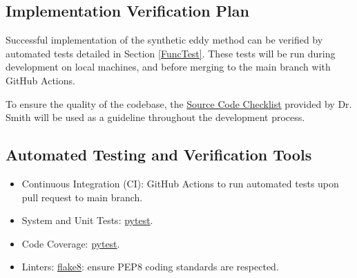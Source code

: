 \documentclass[12pt, titlepage]{article}
\begin{document}

\subsection{Implementation Verification Plan}

Successful implementation of the synthetic eddy method can be verified by automated tests detailed in Section \ref{FuncTest}. These tests will be run during development on local machines, and before merging to the main branch with GitHub Actions.

To ensure the quality of the codebase, the \href{https://github.com/omltcat/turbulent-flow/blob/main/docs/Checklists/Code-Checklist.pdf}{Source Code Checklist} provided by Dr. Smith will be used as a guideline throughout the development process. 



\subsection{Automated Testing and Verification Tools}

\begin{itemize}
  \item Continuous Integration (CI): GitHub Actions to run automated tests upon pull request to main branch.
  \item System and Unit Tests: \href{https://docs.pytest.org/}{pytest}.
  \item Code Coverage: \href{https://docs.pytest.org/}{pytest}.
  \item Linters: \href{https://marketplace.visualstudio.com/items?itemName=ms-python.flake8}{flake8}: ensure PEP8 coding standards are respected.
\end{itemize}

\end{document}
